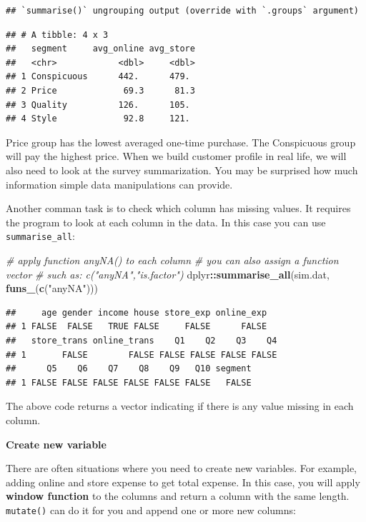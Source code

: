 \documentclass[12pt,]{krantz}
\makeatletter
\newenvironment{Shaded}{\begin{snugshade}}{\end{snugshade}}
\newcommand{\CommentTok}[1]{\textcolor[rgb]{0.37,0.37,0.37}{\textit{#1}}}
\newcommand{\KeywordTok}[1]{\textcolor[rgb]{0.27,0.27,0.27}{\textbf{#1}}}
\newcommand{\NormalTok}[1]{#1}
\newcommand{\OperatorTok}[1]{\textcolor[rgb]{0.43,0.43,0.43}{\textbf{#1}}}
\newcommand{\StringTok}[1]{\textcolor[rgb]{0.5,0.5,0.5}{#1}}
\newenvironment{kframe}{%
\medskip{}
\setlength{\fboxsep}{.8em}
 \def\at@end@of@kframe{}%
 \ifinner\ifhmode%
  \def\at@end@of@kframe{\end{minipage}}%
  \begin{minipage}{\columnwidth}%
 \fi\fi%
 \def\FrameCommand##1{\hskip\@totalleftmargin \hskip-\fboxsep
 \colorbox{shadecolor}{##1}\hskip-\fboxsep
     \hskip-\linewidth \hskip-\@totalleftmargin \hskip\columnwidth}%
 \MakeFramed {\advance\hsize-\width
   \@totalleftmargin\z@ \linewidth\hsize
   \@setminipage}}%
 {\par\unskip\endMakeFramed%
 \at@end@of@kframe}
\renewenvironment{Shaded}{\begin{kframe}}{\end{kframe}}
\makeatother
\begin{document}
\begin{verbatim}
## `summarise()` ungrouping output (override with `.groups` argument)
\end{verbatim}

\begin{verbatim}
## # A tibble: 4 x 3
##   segment     avg_online avg_store
##   <chr>            <dbl>     <dbl>
## 1 Conspicuous      442.      479. 
## 2 Price             69.3      81.3
## 3 Quality          126.      105. 
## 4 Style             92.8     121.
\end{verbatim}

Price group has the lowest averaged one-time purchase. The Conspicuous group will pay the highest price. When we build customer profile in real life, we will also need to look at the survey summarization. You may be surprised how much information simple data manipulations can provide.

Another comman task is to check which column has missing values. It requires the program to look at each column in the data. In this case you can use \texttt{summarise\_all}:

\begin{Shaded}
\begin{Highlighting}[]
\CommentTok{# apply function anyNA() to each column}
\CommentTok{# you can also assign a function vector }
\CommentTok{# such as: c("anyNA","is.factor")}
\NormalTok{dplyr}\OperatorTok{::}\KeywordTok{summarise_all}\NormalTok{(sim.dat, }\KeywordTok{funs_}\NormalTok{(}\KeywordTok{c}\NormalTok{(}\StringTok{"anyNA"}\NormalTok{)))}
\end{Highlighting}
\end{Shaded}

\begin{verbatim}
##     age gender income house store_exp online_exp
## 1 FALSE  FALSE   TRUE FALSE     FALSE      FALSE
##   store_trans online_trans    Q1    Q2    Q3    Q4
## 1       FALSE        FALSE FALSE FALSE FALSE FALSE
##      Q5    Q6    Q7    Q8    Q9   Q10 segment
## 1 FALSE FALSE FALSE FALSE FALSE FALSE   FALSE
\end{verbatim}

The above code returns a vector indicating if there is any value missing in each column.

\textbf{Create new variable}

There are often situations where you need to create new variables. For example, adding online and store expense to get total expense. In this case, you will apply \textbf{window function} to the columns and return a column with the same length. \texttt{mutate()} can do it for you and append one or more new columns:
\end{document}
